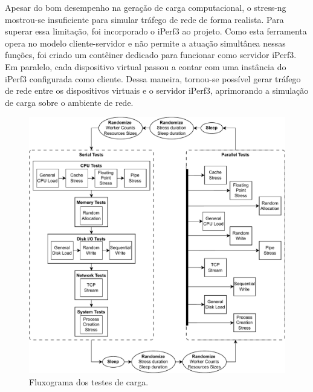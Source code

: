 Apesar do bom desempenho na geração de carga computacional, o stress-ng mostrou-se insuficiente para simular tráfego de rede de forma realista. Para superar essa limitação, foi incorporado o iPerf3 ao projeto. Como esta ferramenta opera no modelo cliente-servidor e não permite a atuação simultânea nessas funções, foi criado um contêiner dedicado para funcionar como servidor iPerf3. Em paralelo, cada dispositivo virtual passou a contar com uma instância do iPerf3 configurada como cliente. Dessa maneira, tornou-se possível gerar tráfego de rede entre os dispositivos virtuais e o servidor iPerf3, aprimorando a simulação de carga sobre o ambiente de rede.


\begin{figure}[H]
\centering
\color{red}
\setlength{\abovecaptionskip}{-10pt}
\includegraphics[width=\textwidth]{Imagens/chap03/load_generator_flowchart2.pdf}
\caption{Fluxograma dos testes de carga.}
\label{fig:FluxogramaCarga}
\end{figure}



